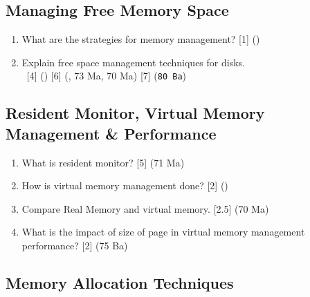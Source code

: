 \documentclass[12pt]{article}
\newcommand{\enter}{\\\textcolor{white}{1}}
\begin{document}
	\subsection{Managing Free Memory Space}
		\begin{enumerate}[noitemsep, topsep=0pt]
			\item What are the strategies for memory management? \hfill [1] ()
			
			\item Explain free space management techniques for disks.
			\enter\hfill [4] () [6] (, 73 Ma, 70 Ma) [7] (\texttt{80 Ba})
		\end{enumerate}

	\subsection{Resident Monitor, Virtual Memory Management \& Performance}
		\begin{enumerate}[noitemsep, topsep=0pt]
			\item What is resident monitor? \hfill [5] (71 Ma)
			
			\item How is virtual memory management done? \hfill [2] ()

			\item Compare Real Memory and virtual memory. \hfill [2.5] (70 Ma)

			\item What is the impact of size of page in virtual memory management performance? \hfill [2] (75 Ba)
		\end{enumerate}
	
	\subsection{Memory Allocation Techniques}
\end{document}
